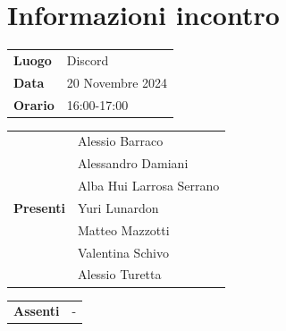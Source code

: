 \section{Informazioni incontro}
\vspace{0.25cm}
\begin{tabular}{p{1.75cm} | l}
    \textbf{Luogo} & Discord\\
    \textbf{Data} & 20 Novembre 2024\\
    \textbf{Orario} & 16:00-17:00\\
\end{tabular}

\vspace{0.5cm}
\noindent
\begin{tabular}{p{1.75cm} | l}
    \multirow{7}{*}{\textbf{Presenti}}
        & Alessio Barraco\\
        & Alessandro Damiani\\
        & Alba Hui Larrosa Serrano\\
        & Yuri Lunardon\\
        & Matteo Mazzotti\\
        & Valentina Schivo\\
        & Alessio Turetta
\end{tabular}

\vspace{0.5cm}
\noindent
\begin{tabular}{p{1.75cm} | l}
    \multirow{1}{*}{\textbf{Assenti}}
        & -\\
\end{tabular}

\vspace{0.5cm}
\noindent

